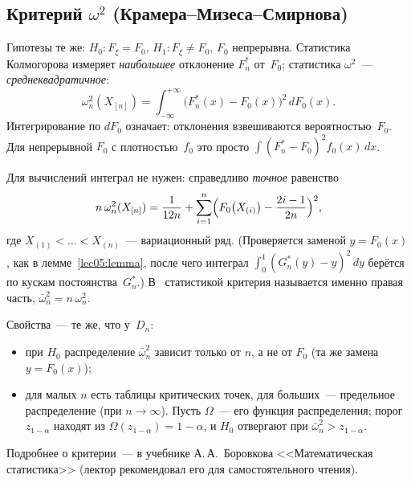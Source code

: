 \subsection{Критерий \texorpdfstring{$\omega^2$}{омега-квадрат} (Крамера--Мизеса--Смирнова)}
\label{lec05:omega}

Гипотезы те же: $H_0 \colon F_\xi = F_0$, $H_1 \colon F_\xi \ne F_0$, $F_0$ непрерывна.
Статистика Колмогорова измеряет \emph{наибольшее} отклонение $F_n^*$ от~$F_0$;
статистика $\omega^2$~--- \emph{среднеквадратичное}:
\[
  \omega_n^2(X_{[n]}) = \int_{-\infty}^{+\infty} \bigl(F_n^*(x) - F_0(x)\bigr)^2 \, dF_0(x).
\]
Интегрирование по $dF_0$ означает: отклонения взвешиваются вероятностью~$F_0$.
Для непрерывной $F_0$ с плотностью~$f_0$ это просто $\int (F_n^* - F_0)^2 f_0(x)\, dx$.

Для вычислений интеграл не нужен: справедливо \emph{точное} равенство
\[
  n\, \omega_n^2(X_{[n]}) = \frac{1}{12n}
    + \sum_{i=1}^{n} \Bigl( F_0\bigl(X_{(i)}\bigr) - \frac{2i-1}{2n} \Bigr)^{2},
\]
где $X_{(1)} < \ldots < X_{(n)}$~--- вариационный ряд. (Проверяется заменой $y = F_0(x)$,
как в лемме~\ref{lec05:lemma}, после чего интеграл $\int_0^1 (G_n^*(y) - y)^2\,dy$
берётся по кускам постоянства~$G_n^*$.) В~\cite[гл.~14, замечание~2.2]{bure}
статистикой критерия называется именно правая часть, $\bar\omega_n^2 = n\,\omega_n^2$.

Свойства~--- те же, что у~$D_n$:
\begin{itemize}
  \item при $H_0$ распределение $\bar\omega_n^2$ зависит только от $n$, а не от $F_0$
        (та же замена $y = F_0(x)$);
  \item для малых $n$ есть таблицы критических точек, для больших~--- предельное
        распределение (при $n \to \infty$). Пусть $\Omega$~--- его функция распределения;
        порог $z_{1-\alpha}$ находят из $\Omega(z_{1-\alpha}) = 1 - \alpha$, и $H_0$
        отвергают при $\bar\omega_n^2 > z_{1-\alpha}$.
\end{itemize}
Подробнее о критерии~--- в учебнике А.\,А.~Боровкова <<Математическая статистика>>
(лектор рекомендовал его для самостоятельного чтения).

